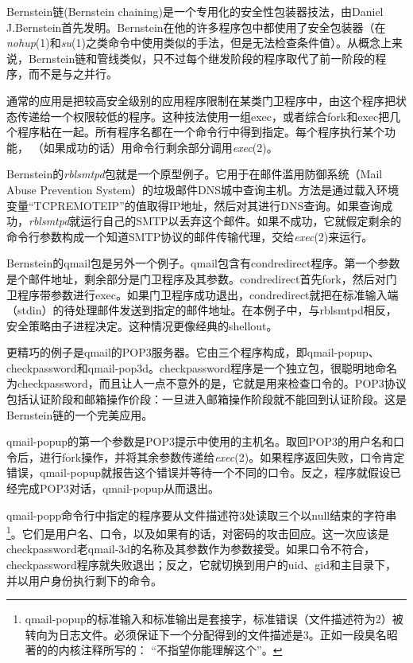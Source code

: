 \documentclass[12pt,oneside]{book}
\begin{document}
Bernstein链(Bernstein  chaining)是一个专用化的安全性包装器技法，由Daniel J.Bernstein首先发明。Bernstein在他的许多程序包中都使用了安全包装器（在\textit{nohup}(1)和\textit{su}(1)之类命令中使用类似的手法，但是无法检查条件值）。从概念上来说，Bernstein链和管线类似，只不过每个继发阶段的程序取代了前一阶段的程序，而不是与之并行。

通常的应用是把较高安全级别的应用程序限制在某类门卫程序中，由这个程序把状态传递给一个权限较低的程序。这种技法使用一组exec，或者综合fork和exec把几个程序粘在一起。所有程序名都在一个命令行中得到指定。每个程序执行某个功能，  （如果成功的话）用命令行剩余部分调用\textit{exec}(2)。

Bernstein的\textit{rblsmtpd}包就是一个原型例子。它用于在邮件滥用防御系统（Mail Abuse Prevention System）的垃圾邮件DNS城中查询主机。方法是通过载入环境变量“TCPREMOTEIP”的值取得IP地址，然后对其进行DNS查询。如果查询成功，\textit{rblsmtpd}就运行自己的SMTP以丢弃这个邮件。如果不成功，它就假定剩余的命令行参数构成一个知道SMTP协议的邮件传输代理，交给\textit{exec}(2)来运行。

Bernstein的qmail包是另外一个例子。qmail包含有condredirect程序。第一个参数是个邮件地址，剩余部分是门卫程序及其参数。condredirect首先fork，然后对门卫程序带参数进行exec。如果门卫程序成功退出，condredirect就把在标准输入端（stdin）的待处理邮件发送到指定的邮件地址。在本例子中，与rblsmtpd相反，安全策略由子进程决定。这种情况更像经典的shellout。

更精巧的例子是qmail的POP3服务器。它由三个程序构成，即qmail-popup、checkpassword和qmail-pop3d。checkpassword程序是一个独立包，很聪明地命名为checkpassword，而且让人一点不意外的是，它就是用来检查口令的。POP3协议包括认证阶段和邮箱操作价段：一旦进入邮箱操作阶段就不能回到认证阶段。这是Bernstein链的一个完美应用。

qmail-popup的第一个参数是POP3提示中使用的主机名。取回POP3的用户名和口令后，进行fork操作，并将其余参数传递给\textit{exec}(2)。如果程序返回失败，口令肯定错误，qmail-popup就报告这个错误并等待一个不同的口令。反之，程序就假设已经完成POP3对话，qmail-popup从而退出。

qmail-popp命令行中指定的程序要从文件描述符3处读取三个以null结束的字符串\footnote{qmail-popup的标准输入和标准输出是套接字，标准错误（文件描述符为2）被转向为日志文件。必须保证下一个分配得到的文件描述是3。正如一段臭名昭著的的内核注释所写的：  “不指望你能理解这个”。}。它们是用户名、口令，以及如果有的话，对密码的攻击回应。这一次应该是checkpassword老qmail-3d的名称及其参数作为参数接受。如果口令不符合，checkpassword程序就失败退出；反之，它就切换到用户的uid、gid和主目录下，并以用户身份执行剩下的命令。
\end{document}
